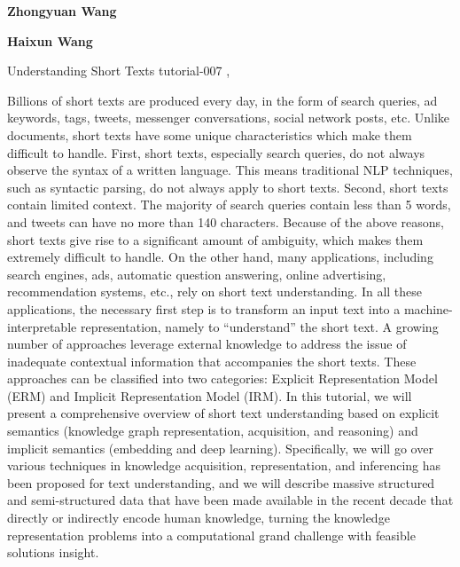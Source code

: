 \begin{bio}

{\bfseries Zhongyuan Wang}

{\bfseries Haixun Wang}

\end{bio}

\begin{tutorial}
  {Understanding Short Texts}
  {tutorial-007}
  {\daydateyear, \tutorialafternoontime}
  {\TutLocG}

Billions of short texts are produced every day, in the form of search queries, ad keywords, tags, tweets, messenger conversations, social network posts, etc. Unlike documents, short texts have some unique characteristics which make them difficult to handle. First, short texts, especially search queries, do not always observe the syntax of a written language. This means traditional NLP techniques, such as syntactic parsing, do not always apply to short texts. Second, short texts contain limited context. The majority of search queries contain less than 5 words, and tweets can have no more than 140 characters. Because of the above reasons, short texts give rise to a significant amount of ambiguity, which makes them extremely difficult to handle. On the other hand, many applications, including search engines, ads, automatic question answering, online advertising, recommendation systems, etc., rely on short text understanding. In all these applications, the necessary first step is to transform an input text into a machine-interpretable representation, namely to ``understand'' the short text. A growing number of approaches leverage external knowledge to address the issue of inadequate contextual information that accompanies the short texts. These approaches can be classified into two categories: Explicit Representation Model (ERM) and Implicit Representation Model (IRM). In this tutorial, we will present a comprehensive overview of short text understanding based on explicit semantics (knowledge graph representation, acquisition, and reasoning) and implicit semantics (embedding and deep learning). Specifically, we will go over various techniques in knowledge acquisition, representation, and inferencing has been proposed for text understanding, and we will describe massive structured and semi-structured data that have been made available in the recent decade that directly or indirectly encode human knowledge, turning the knowledge representation problems into a computational grand challenge with feasible solutions insight.
\end{tutorial}
